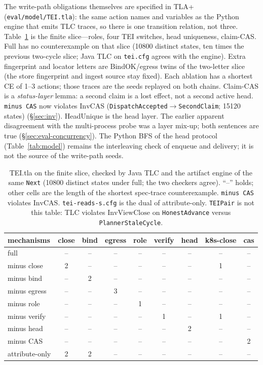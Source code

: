 \documentclass[acmsmall,manuscript,review,anonymous]{acmart}
\renewcommand{\_}{\discretionary{\textunderscore}{}{\textunderscore}}
\begin{document}
The write-path obligations themselves are specified in TLA+
(\texttt{eval/model/TEI.tla}): the same action names and variables as the
Python engine that emits TLC traces, so there is one transition relation,
not three. Table~\ref{tab:tlc} is the finite slice---roles, four TEI
switches, head uniqueness, claim-CAS. Full has no counterexample on that
slice (10800 distinct states, ten times the previous two-cycle slice;
Java {TLC} on \texttt{tei.cfg} agrees with
the engine). Extra fingerprint and locator letters are
$\mathrm{BindOK}$/egress twins of the two-letter slice (the store
fingerprint and ingest source stay fixed).
Each ablation has a shortest CE of 1--3 actions; those traces
are the seeds replayed on both chains. Claim-CAS is a \emph{status-layer}
lemma: a second claim is a lost effect, not a second active head.
\texttt{minus CAS} now violates $\mathrm{InvCAS}$
(\texttt{DispatchAccepted}$\to$\texttt{SecondClaim}; 15120 states)
(\S\ref{sec:inv}).
HeadUnique is the head layer. The earlier apparent disagreement with the
multi-process probe was a layer mix-up; both sentences are true
(\S\ref{sec:eval-concurrency}). The Python BFS of the head protocol
(Table~\ref{tab:model}) remains the interleaving check of enqueue and
delivery; it is not the source of the write-path seeds.

\begin{table}[t]
\centering
\small
\caption{TEI.tla on the finite slice, checked by Java {TLC} and the
artifact engine of the same \texttt{Next} (10800 distinct states under
full; the two checkers agree).
``--'' holds; other cells are the length
of the shortest spec-trace counterexample. \texttt{minus CAS} violates
$\mathrm{InvCAS}$. \texttt{tei-reads-s.cfg} is the dual of
attribute-only. \texttt{TEIPair} is not this
table: {TLC} violates $\mathrm{InvViewClose}$ on \texttt{HonestAdvance}
versus \texttt{PlannerStaleCycle}.}
\label{tab:tlc}
\begin{tabular}{@{}lcccccccc@{}}
\hline
mechanisms & close & bind & egress & role & verify & head & k8s-close & cas \\
\hline
full & -- & -- & -- & -- & -- & -- & -- & -- \\
minus close & 2 & -- & -- & -- & -- & -- & 1 & -- \\
minus bind & -- & 2 & -- & -- & -- & -- & -- & -- \\
minus egress & -- & -- & 3 & -- & -- & -- & -- & -- \\
minus role & -- & -- & -- & 1 & -- & -- & -- & -- \\
minus verify & -- & -- & -- & -- & 1 & -- & 1 & -- \\
minus head & -- & -- & -- & -- & -- & 2 & -- & -- \\
minus CAS & -- & -- & -- & -- & -- & -- & -- & 2 \\
attribute-only & 2 & 2 & -- & -- & -- & -- & -- & -- \\
\hline
\end{tabular}
\end{table}
\end{document}
